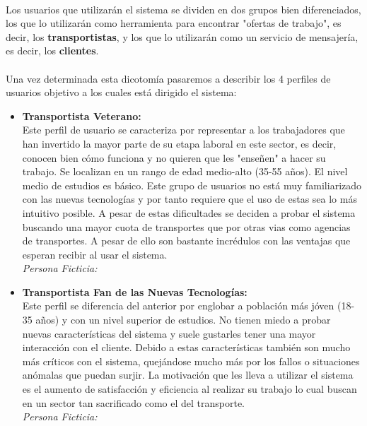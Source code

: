 \documentclass[10pt, a4paper,spanish]{article}
\begin{document}
		\paragraph{}
		Los usuarios que utilizarán el sistema se dividen en dos grupos bien diferenciados, los que lo utilizarán como herramienta para encontrar "ofertas de trabajo", es decir, los \textbf{transportistas}, y los que lo utilizarán como un servicio de mensajería, es decir, los \textbf{clientes}.

		\paragraph{}
		Una vez determinada esta dicotomía pasaremos a describir los 4 perfiles de usuarios objetivo a los cuales está dirigido el sistema:

		\begin{itemize}
			\item \textbf{Transportista Veterano:} \\
				Este perfil de usuario se caracteriza por representar a los trabajadores que han invertido la mayor parte de su etapa laboral en este sector, es decir, conocen bien cómo funciona y no quieren que les "enseñen" a hacer su trabajo. Se localizan en un rango de edad medio-alto (35-55 años). El nivel medio de estudios es básico. Este grupo de usuarios no está muy familiarizado con las nuevas tecnologías y por tanto requiere que el uso de estas sea lo más intuitivo posible. A pesar de estas dificultades se deciden a probar el sistema buscando una mayor cuota de transportes que por otras vias como agencias de transportes. A pesar de ello son bastante incrédulos con las ventajas que esperan recibir al usar el sistema. \\
				\textit{Persona Ficticia:}

			\item \textbf{Transportista Fan de las Nuevas Tecnologías:} \\
				Este perfil se diferencia del anterior por englobar a población más jóven (18-35 años) y con un nivel superior de estudios. No tienen miedo a probar nuevas características del sistema y suele gustarles tener una mayor interacción con el cliente. Debido a estas características también son mucho más críticos con el sistema, quejándose mucho más por los fallos o situaciones anómalas que puedan surjir. La motivación que les lleva a utilizar el sistema es el aumento de satisfacción y eficiencia al realizar su trabajo lo cual buscan en un sector tan sacrificado como el del transporte. \\
				\textit{Persona Ficticia:}


\end{itemize}
\end{document}
